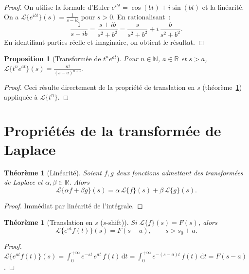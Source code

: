 \documentclass[12pt,a4paper,openany]{book}
\theoremstyle{definition}
\theoremstyle{plain}
\newtheorem{theoreme}[definition]{Théorème}
\newtheorem{proposition}[definition]{Proposition}
\theoremstyle{remark}
\newcommand{\R}{\mathbb{R}}
\newcommand{\N}{\mathbb{N}}
\newcommand{\dd}{\mathrm{d}}
\begin{document}
\begin{proof}
  On utilise la formule d'Euler $e^{ibt}=\cos(bt)+i\sin(bt)$ et la
  linéarité. On a $\mathcal{L}\{e^{ibt}\}(s)=\frac{1}{s-ib}$ pour
  $s>0$. En rationalisant~:
  \[
    \frac{1}{s-ib}=\frac{s+ib}{s^2+b^2}
    = \frac{s}{s^2+b^2} + i\,\frac{b}{s^2+b^2}.
  \]
  En identifiant parties réelle et imaginaire, on obtient le résultat.
\end{proof}

\begin{proposition}[Transformée de $t^n e^{at}$]\label{prop:laplace-tneat}
  Pour $n\in\N$, $a\in\R$ et $s>a$,
  $\displaystyle\mathcal{L}\{t^n e^{at}\}(s)=\frac{n!}{(s-a)^{n+1}}$.
\end{proposition}

\begin{proof}
  Ceci résulte directement de la propriété de translation en $s$
  (théorème~\ref{thm:s-shift}) appliquée à $\mathcal{L}\{t^n\}$.
\end{proof}

\section{Propriétés de la transformée de Laplace}\label{sec:proprietes-laplace}

\begin{theoreme}[Linéarité]\label{thm:linearite-laplace}
  Soient $f,g$ deux fonctions admettant des transformées de Laplace
  et $\alpha,\beta\in\R$. Alors
  \[
    \mathcal{L}\{\alpha f+\beta g\}(s)
    = \alpha\,\mathcal{L}\{f\}(s)+\beta\,\mathcal{L}\{g\}(s).
  \]
\end{theoreme}

\begin{proof}
  Immédiat par linéarité de l'intégrale.
\end{proof}

\begin{theoreme}[Translation en $s$ ($s$-shift)]\label{thm:s-shift}
  Si $\mathcal{L}\{f\}(s)=F(s)$, alors
  \[
    \mathcal{L}\{e^{at}f(t)\}(s) = F(s-a), \qquad s>s_0+a.
  \]
\end{theoreme}

\begin{proof}
  $\displaystyle
  \mathcal{L}\{e^{at}f(t)\}(s)
  = \int_0^{+\infty}e^{-st}\,e^{at}\,f(t)\,\dd t
  = \int_0^{+\infty}e^{-(s-a)t}\,f(t)\,\dd t
  = F(s-a)$.
\end{proof}
\end{document}
